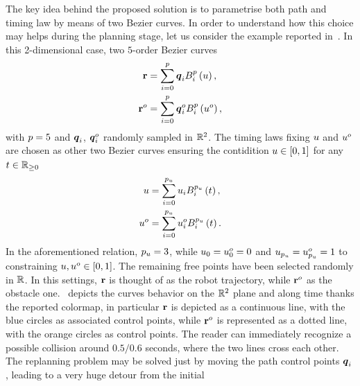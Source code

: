 The key idea behind the proposed solution is to parametrise both path and timing law by means of two B\acuteacc ezier curves.
In order to understand how this choice may helps during the planning stage, let us consider the example reported in~.
In this 2-dimensional case, two $5$-order B\acuteacc ezier curves
\begin{equation*}
    \begin{split}
        \mathbf{r} & = \sum_{i = 0}^{p} \boldsymbol{q}_i B_i^{p} \left( u \right), \\
        \mathbf{r}^{o} & = \sum_{i = 0}^{p} \boldsymbol{q}_i^{o} B_i^{p} \left( u^{o} \right),
    \end{split}
\end{equation*}
with $p = 5$ and $\boldsymbol{q}_i$, $\boldsymbol{q}_i^{o}$ randomly sampled in $\mathbb{R}^2$.
The timing laws fixing $u$ and $u^{o}$ are chosen as other two B\acuteacc ezier curves ensuring the contidition
$u \in \left[ 0, 1 \right]$ for any $t \in \mathbb{R}_{\ge 0}$
\begin{equation*}
    \begin{split}
        u & = \sum_{i = 0}^{p_{u}} u_i B_i^{p_{u}} \left( t \right), \\
        u^{o} & = \sum_{i = 0}^{p_{u}} u_i^{o} B_i^{p_{u}} \left( t \right).
    \end{split}
\end{equation*}
In the aforementioned relation, $p_{u} = 3$, while $u_0 = u_0^o = 0$ and 
$u_{p_{u}} = u_{p_{u}}^o = 1$ to constraining $u, u^o \in \left[ 0,1 \right]$.
The remaining free points have been selected randomly in $\mathbb{R}$.
In this settings, $\mathbf{r}$ is thought of as the robot trajectory, while $\mathbf{r}^{o}$ as the obstacle one.~
depicts the curves behavior on the $\mathbb{R}^2$ plane and along time thanks the reported colormap, in particular $\mathbf{r}$ is depicted as a continuous line,
with the blue circles as associated control points, while $\mathbf{r}^o$ is represented as a dotted line, with the orange circles as control points.
The reader can immediately recognize a possible collision around $0.5/0.6$ seconds, where the two lines cross each other.
The replanning problem may be solved just by moving the path control points $\boldsymbol{q}_i$, leading to a very huge detour from the initial
